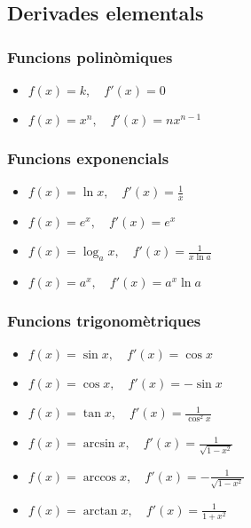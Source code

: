 \subsection{Derivades elementals}
\subsubsection*{Funcions polinòmiques}
\begin{itemize}
    \item $f(x) = k , \quad f'(x) = 0$
    \item $f(x) = x^{n} , \quad f'(x) = n x^{n-1}$
\end{itemize}

\subsubsection*{Funcions exponencials}
\begin{itemize}
    \item $f(x) = \ln x , \quad f'(x) = \frac{1}{x}$
    \item $f(x) = e^{x} , \quad f'(x) = e^{x}$
    \item $f(x) = \log_{a} x, \quad f'(x) = \frac{1}{x \ln a}$
    \item $f(x) = a^{x} , \quad f'(x) = a^{x} \ln a$
\end{itemize}

\subsubsection*{Funcions trigonomètriques}
\begin{itemize}
    \item $f(x) = \sin x , \quad f'(x) = \cos x$
    \item $f(x) = \cos x , \quad f'(x) = - \sin x $
    \item $f(x) = \tan x , \quad f'(x) = \frac{1}{\cos^{2} x} $
    \item $f(x) = \arcsin x , \quad f'(x) = \frac{1}{\sqrt{1 - x^{2}}}$
    \item $f(x) = \arccos x , \quad f'(x) = - \frac{1}{\sqrt{1 - x^{2}}}$
    \item $f(x) = \arctan x , \quad f'(x) = \frac{1}{1 + x^{2}}$
\end{itemize}

